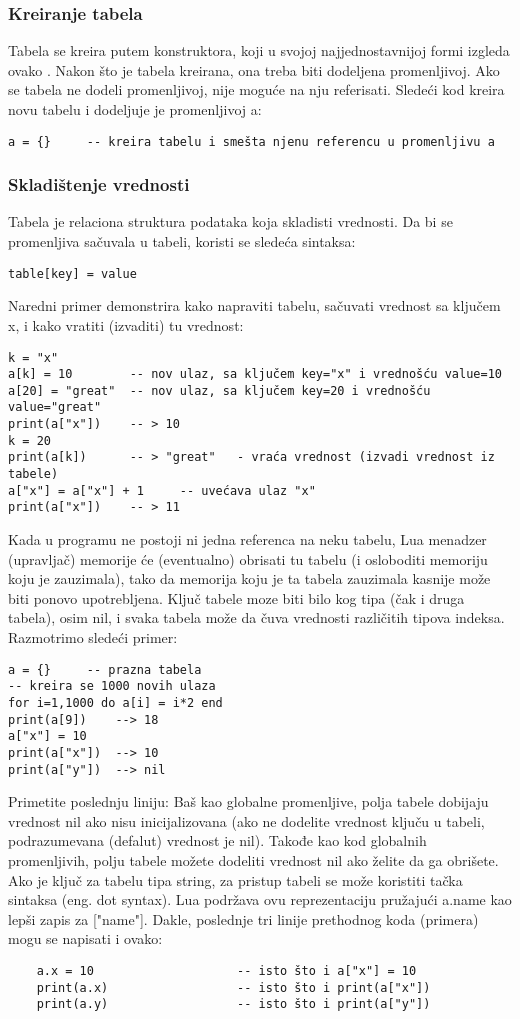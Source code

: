 \documentclass[a4paper]{article}
\begin{document}
\subsubsection{Kreiranje tabela}
Tabela se kreira putem konstruktora, koji u svojoj najjednostavnijoj formi izgleda ovako {}. Nakon što je tabela kreirana, ona treba biti dodeljena promenljivoj. Ako se tabela ne dodeli promenljivoj, nije moguće na nju referisati. Sledeći kod kreira novu tabelu i dodeljuje je promenljivoj a:
\begin{verbatim}
a = {}     -- kreira tabelu i smešta njenu referencu u promenljivu a
\end{verbatim}

\subsubsection{Skladištenje vrednosti}
Tabela je relaciona struktura podataka koja skladisti vrednosti. Da bi se promenljiva sačuvala u tabeli, koristi se sledeća sintaksa:
\begin{verbatim}
table[key] = value
\end{verbatim}
Naredni primer demonstrira kako napraviti tabelu, sačuvati vrednost sa ključem x, i kako vratiti (izvaditi) tu vrednost:
\begin{verbatim}
k = "x"
a[k] = 10        -- nov ulaz, sa ključem key="x" i vrednošću value=10
a[20] = "great"  -- nov ulaz, sa ključem key=20 i vrednošću value="great"
print(a["x"])    -- > 10
k = 20
print(a[k])      -- > "great"	- vraća vrednost (izvadi vrednost iz tabele)
a["x"] = a["x"] + 1     -- uvećava ulaz "x"
print(a["x"])    -- > 11
\end{verbatim}
Kada u programu ne postoji ni jedna referenca na neku tabelu, Lua menadzer (upravljač) memorije će (eventualno) obrisati tu tabelu (i osloboditi memoriju koju je zauzimala), tako da memorija koju je ta tabela zauzimala kasnije može biti ponovo upotrebljena.
Ključ tabele moze biti bilo kog tipa (čak i druga tabela), osim nil, i svaka tabela može da čuva vrednosti različitih tipova indeksa. Razmotrimo sledeći primer:
\begin{verbatim}
a = {}     -- prazna tabela
-- kreira se 1000 novih ulaza
for i=1,1000 do a[i] = i*2 end
print(a[9])    --> 18
a["x"] = 10
print(a["x"])  --> 10
print(a["y"])  --> nil
\end{verbatim}
Primetite poslednju liniju: Baš kao globalne promenljive, polja tabele dobijaju vrednost nil ako nisu inicijalizovana (ako ne dodelite vrednost ključu u tabeli, podrazumevana (defalut) vrednost je nil). Takođe kao kod globalnih promenljivih, polju tabele možete dodeliti vrednost nil ako želite da ga obrišete.
Ako je ključ za tabelu tipa string, za pristup tabeli se može koristiti tačka sintaksa (eng. dot syntax). Lua podržava ovu reprezentaciju pružajući a.name kao lepši zapis za ["name"]. Dakle, poslednje tri linije prethodnog koda (primera) mogu se napisati i ovako:
\begin{verbatim}
    a.x = 10                    -- isto što i a["x"] = 10
    print(a.x)                  -- isto što i print(a["x"])
    print(a.y)                  -- isto što i print(a["y"])
\end{verbatim}
\end{document}
